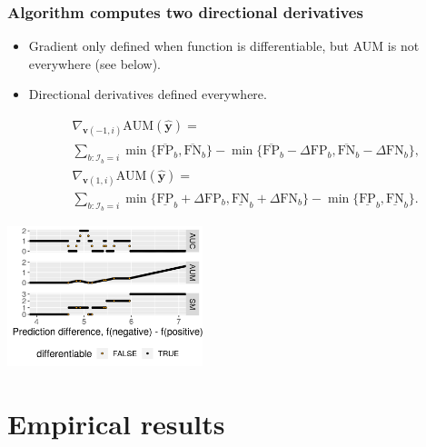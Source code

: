 \documentclass{beamer}
\begin{document}
\begin{frame}
  \frametitle{Algorithm computes two directional derivatives }

  \begin{itemize}
  \item Gradient only defined when function is differentiable, but AUM
    is not everywhere (see below).
  \item Directional derivatives defined everywhere.
  \end{itemize}
\begin{eqnarray*}
  &&\nabla_{\mathbf v(-1,i)} \text{AUM}(\mathbf{\hat y}) = \\
  &&\sum_{b: \mathcal I_b = i}
  \min\{
  \overline{\text{FP}}_b , 
  \overline{\text{FN}}_b 
  \}
  -
  \min\{
  \overline{\text{FP}}_b - \Delta\text{FP}_b, 
  \overline{\text{FN}}_b - \Delta\text{FN}_b
  \},\\
  &&\nabla_{\mathbf v(1,i)} \text{AUM}(\mathbf{\hat y}) = \\
  &&\sum_{b: \mathcal I_b = i}
  \min\{
  \underline{\text{FP}}_b + \Delta\text{FP}_b, 
  \underline{\text{FN}}_b + \Delta\text{FN}_b
  \}
  -
  \min\{
  \underline{\text{FP}}_b , 
  \underline{\text{FN}}_b 
     \}.
\end{eqnarray*}  

  \includegraphics[height=1.6in]{figure-aum-convexity}

\end{frame}


\section{Empirical results}
\end{document}
